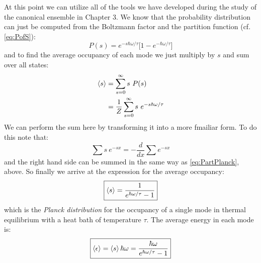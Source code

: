 At this point we can utilize all of the tools we have developed during the study of the canonical ensemble in Chapter 3. We know that the probability 
distribution can just be computed from the Boltzmann factor and the partition 
function (cf.\,\cref{eq:PofS}):
\begin{equation}
P(s) = e^{-s \hbar \omega / \tau} \bigg[ 1 - e^{-\hbar \omega / \tau} \bigg]
\end{equation}
and to find the average occupancy of each mode we just multiply by $s$ and sum over all states:
\begin{align}
\Braket{s} &= \sum_{s=0}^{\infty} s~P(s) \\
           &= \frac{1}{Z} \sum_{s=0}^{\infty} s~e^{-s \hbar \omega / \tau}
\end{align}
We can perform the sum here by transforming it into a more fmailiar form. To do this note that:
\begin{equation}
\sum s~e^{-s x} = -\frac{d}{dx} \sum e^{-s x}
\end{equation}
and the right hand side can be summed in the same way as \cref{eq:PartPlanck}, above.
So finally we arrive at the expression for the average occupancy:
\begin{equation}
\boxed{\Braket{s} = \frac{1}{e^{\hbar \omega / \tau} - 1}}
\end{equation}
which is the \emph{Planck distribution} for the occupancy of a single mode in thermal equilibrium with a heat bath of temperature $\tau$. The average energy in each mode is:
\begin{equation}
\boxed{\Braket{\epsilon} = \Braket{s} \hbar \omega= 
\frac{\hbar \omega}{e^{\hbar \omega / \tau} - 1}}
\end{equation}


